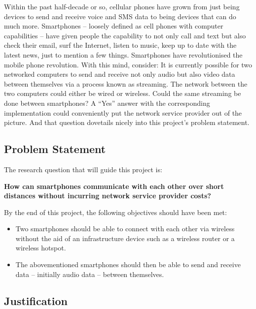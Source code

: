 \documentclass[12pt,svgnames,smaller]{article} %
\begin{document}
Within the past half-decade or so, cellular phones have grown from just being devices to send and receive voice and SMS data to being devices that can do much more. Smartphones – loosely defined as cell phones with computer capabilities – have given people the capability to not only call and text but also check their email, surf the Internet, listen to music, keep up to date with the latest news, just to mention a few things. Smartphones have revolutionised the mobile phone revolution. With this mind, consider: It is currently possible for two networked computers to send and receive not only audio but also video data between themselves via a process known as streaming. The network between the two computers could either be wired or wireless. Could the same streaming be done between smartphones? A “Yes” answer with the corresponding implementation could conveniently put the network service provider out of the picture. And that question dovetails nicely into this project’s problem statement.


\subsection{Problem Statement} 

The research question that will guide this project is:

\textbf{How can smartphones communicate with each other over short distances without incurring network service provider costs? }

By the end of this project, the following objectives should have been met:

\begin{itemize}
	\item Two smartphones should be able to connect with each other via wireless without the aid of an infrastructure device such as a wireless router or a wireless hotspot.
	\item The abovementioned smartphones should then be able to send and receive data – initially audio data – between themselves.
\end{itemize}



\subsection{Justification} 
\end{document}
